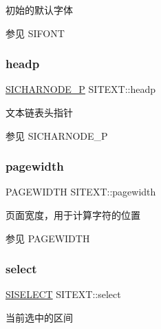 初始的默认字体 

\begin{DoxySeeAlso}{参见}
S\+I\+F\+O\+NT 
\end{DoxySeeAlso}
\mbox{\label{class_s_i_t_e_x_t_a50c3c59ac0a71a940d688e9d4d901bee}} 
\subsubsection{\texorpdfstring{headp}{headp}}
{\footnotesize\ttfamily \hyperlink{class_s_i_c_h_a_r_n_o_d_e}{S\+I\+C\+H\+A\+R\+N\+O\+D\+E\+\_\+P} S\+I\+T\+E\+X\+T\+::headp}



文本链表头指针 

\begin{DoxySeeAlso}{参见}
S\+I\+C\+H\+A\+R\+N\+O\+D\+E\+\_\+P 
\end{DoxySeeAlso}
\mbox{\label{class_s_i_t_e_x_t_afcb828b5d1da58d0f60088097e8c107b}} 
\subsubsection{\texorpdfstring{pagewidth}{pagewidth}}
{\footnotesize\ttfamily P\+A\+G\+E\+W\+I\+D\+TH S\+I\+T\+E\+X\+T\+::pagewidth}



页面宽度，用于计算字符的位置 

\begin{DoxySeeAlso}{参见}
P\+A\+G\+E\+W\+I\+D\+TH 
\end{DoxySeeAlso}
\mbox{\label{class_s_i_t_e_x_t_a536f8decde35b0149619ca1719c887b0}} 
\subsubsection{\texorpdfstring{select}{select}}
{\footnotesize\ttfamily \hyperlink{struct_s_i_r_a_n_g_e}{S\+I\+S\+E\+L\+E\+CT} S\+I\+T\+E\+X\+T\+::select}



当前选中的区间 

